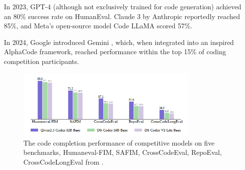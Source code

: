 In 2023, GPT-4 \cite{openai2023gpt4} (although not 
exclusively trained for code generation)  
achieved an 80\% success rate on HumanEval. 
Claude 3 by Anthropic reportedly reached 85\%, 
and Meta’s open-source model Code LLaMA 
\cite{roziere2023code} scored 57\%.

In 2024, Google introduced Gemini \cite{AlphaCode_2}, 
which, when integrated into an inspired AlphaCode framework, 
reached performance within the top 15\% of coding competition 
participants.



\begin{figure}[ht]
    \centering
    \includegraphics[width=0.8\textwidth]{img/1/image.png}
    \caption{The code completion performance of competitive models on five benchmarks,
Humaneval-FIM, SAFIM, CrossCodeEval, RepoEval, CrossCodeLongEval from \cite{hui2024qwen2}.}
    \label{fig:LLM-coder-examples}
\end{figure}